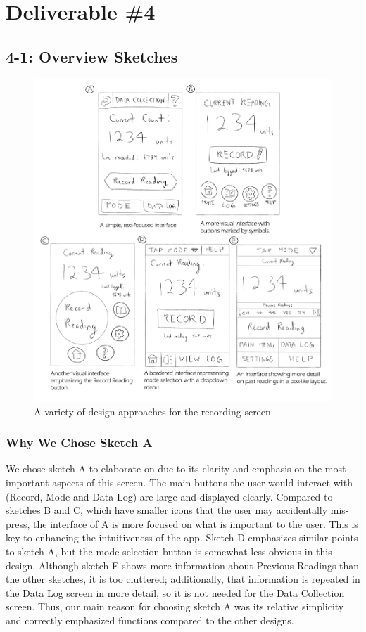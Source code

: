 \documentclass[11pt,a4paper]{article}
\begin{document}
\section*{Deliverable \#4}
\subsection*{4-1: Overview Sketches}
\bigskip
\begin{figure}[h]
  \centering
      \includegraphics[width=1.1\textwidth]{overviewsketches.png}
  \caption{A variety of design approaches for the recording screen}
\end{figure}

\newpage
\subsubsection*{Why We Chose Sketch A}

We chose sketch A to elaborate on due to its clarity and emphasis on the most important aspects of this screen. The main buttons the user would interact with (Record, Mode and Data Log) are large and displayed clearly. Compared to sketches B and C, which have smaller icons that the user may accidentally mis-press, the interface of A is more focused on what is important to the user. This is key to enhancing the intuitiveness of the app. Sketch D emphasizes similar points to sketch A, but the mode selection button is somewhat less obvious in this design. Although sketch E shows more information about Previous Readings than the other sketches, it is too cluttered; additionally, that information is repeated in the Data Log screen in more detail, so it is not needed for the Data Collection screen. Thus, our main reason for choosing sketch A was its relative simplicity and correctly emphasized functions compared to the other designs.
\end{document}
